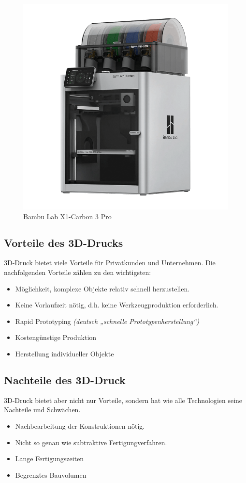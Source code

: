 \begin{figure}[H]
	\centering
	\includegraphics[width=0.8\linewidth]{images/3D-Drucker.png}
	\caption[Bambu Lab X1-Carbon 3 Pro]{Bambu Lab X1-Carbon 3 Pro}
	\label{fig:3D-Druck}
\end{figure}


\subsection{Vorteile des 3D-Drucks}
3D-Druck bietet viele Vorteile für Privatkunden und Unternehmen. Die nachfolgenden Vorteile zählen zu den wichtigsten:
\begin{itemize}
	\item Möglichkeit, komplexe Objekte relativ schnell herzustellen.
	\item Keine Vorlaufzeit nötig, d.h. keine Werkzeugproduktion erforderlich.
	\item Rapid Prototyping \emph{(deutsch „schnelle Prototypenherstellung“)}
	\item Kostengünstige Produktion
	\item Herstellung individueller Objekte
\end{itemize} \textcite{3DDruckVorteile}

\subsection{Nachteile des 3D-Druck}
3D-Druck bietet aber nicht nur Vorteile, sondern hat wie alle Technologien seine Nachteile und Schwächen.
\begin{itemize}
	\item Nachbearbeitung der Konstruktionen nötig.
	\item Nicht so genau wie subtraktive Fertigungverfahren.
	\item Lange Fertigungszeiten
	\item Begrenztes Bauvolumen
\end{itemize}
\textcite{3DDruckNachteile}

